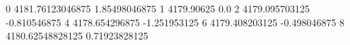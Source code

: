 0 4181.76123046875 1.85498046875
1 4179.90625 0.0
2 4179.095703125 -0.810546875
4 4178.654296875 -1.251953125
6 4179.408203125 -0.498046875
8 4180.62548828125 0.71923828125
